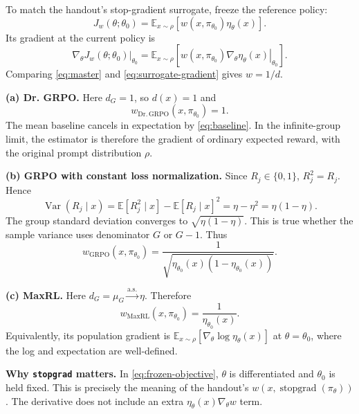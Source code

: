 \documentclass[11pt,a4paper]{article}
\newcommand{\E}{\mathbb{E}}
\newcommand{\sg}{\operatorname{stopgrad}}
\newcommand{\Var}{\operatorname{Var}}
\newcommand{\as}{\xrightarrow{\mathrm{a.s.}}}
\begin{document}
To match the handout's stop-gradient surrogate, freeze the reference policy:
\begin{equation}
  J_w(\theta;\theta_0)
  =\E_{x\sim\rho}\!\left[w(x,\pi_{\theta_0})\eta_\theta(x)\right].
  \label{eq:frozen-objective}
\end{equation}
Its gradient at the current policy is
\begin{equation}
  \left.\nabla_\theta J_w(\theta;\theta_0)\right|_{\theta_0}
  =\E_{x\sim\rho}\!\left[
       w(x,\pi_{\theta_0})
       \left.\nabla_\theta\eta_\theta(x)\right|_{\theta_0}\right].
  \label{eq:surrogate-gradient}
\end{equation}
Comparing \eqref{eq:master} and \eqref{eq:surrogate-gradient} gives $w=1/d$.

\textbf{(a) Dr. GRPO.} Here $d_G=1$, so $d(x)=1$ and
\begin{equation}
  \boxed{w_{\mathrm{Dr.\,GRPO}}(x,\pi_{\theta_0})=1.}
\end{equation}
The mean baseline cancels in expectation by \eqref{eq:baseline}. In the
infinite-group limit, the estimator is therefore the gradient of ordinary
expected reward, with the original prompt distribution $\rho$.

\textbf{(b) GRPO with constant loss normalization.} Since $R_j\in\{0,1\}$,
$R_j^2=R_j$. Hence
\begin{equation}
  \Var(R_j\mid x)=\E[R_j^2\mid x]-\E[R_j\mid x]^2
  =\eta-\eta^2=\eta(1-\eta).
\end{equation}
The group standard deviation converges to $\sqrt{\eta(1-\eta)}$. This is true
whether the sample variance uses denominator $G$ or $G-1$. Thus
\begin{equation}
  \boxed{\displaystyle
  w_{\mathrm{GRPO}}(x,\pi_{\theta_0})
    =\frac{1}{\sqrt{\eta_{\theta_0}(x)(1-\eta_{\theta_0}(x))}}.}
\end{equation}

\textbf{(c) MaxRL.} Here $d_G=\mu_G\as\eta$. Therefore
\begin{equation}
  \boxed{\displaystyle
  w_{\mathrm{MaxRL}}(x,\pi_{\theta_0})
    =\frac{1}{\eta_{\theta_0}(x)}.}
\end{equation}
Equivalently, its population gradient is
$\E_{x\sim\rho}[\nabla_\theta\log\eta_\theta(x)]$ at $\theta=\theta_0$,
where the log and expectation are well-defined.

\newpage

\textbf{Why \texttt{stopgrad} matters.}
In \eqref{eq:frozen-objective}, $\theta$ is differentiated and $\theta_0$ is held
fixed. This is precisely the meaning of the handout's
$w(x,\sg(\pi_\theta))$. The derivative does not include an extra
$\eta_\theta(x)\nabla_\theta w$ term.
\end{document}
